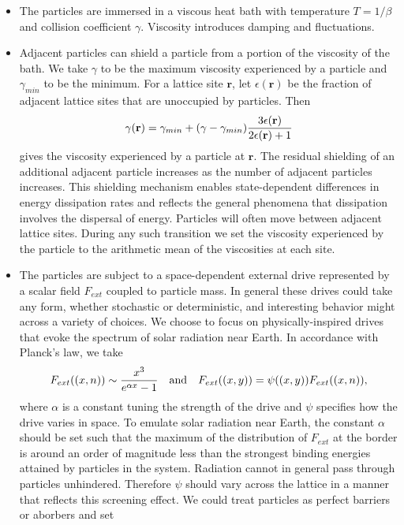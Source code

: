 \documentclass[12pt,letterpaper]{article}
\newcommand{\mb}{\mathbf}
\begin{document}
\begin{itemize}
\item The particles are immersed in a viscous heat bath with temperature $T = 1/\beta$ and collision coefficient $\gamma$. Viscosity introduces damping and fluctuations.
\item Adjacent particles can shield a particle from a portion of the viscosity of the bath. We take $\gamma$ to be the maximum viscosity experienced by a particle and $\gamma_{min}$ to be the minimum. For a lattice site $\mb{r}$, let $\epsilon(\mb{r})$ be the fraction of adjacent lattice sites that are unoccupied by particles. Then
\begin{align*}
\gamma(\mb{r}) = \gamma_{min} + (\gamma - \gamma_{min}){3\epsilon(\mb{r}) \over 2\epsilon(\mb{r}) + 1}
\end{align*}
gives the viscosity experienced by a particle at $\mb{r}$. The residual shielding of an additional adjacent particle increases as the number of adjacent particles increases. This shielding mechanism enables state-dependent differences in energy dissipation rates and reflects the general phenomena that dissipation involves the dispersal of energy. Particles will often move between adjacent lattice sites. During any such transition we set the viscosity experienced by the particle to the arithmetic mean of the viscosities at each site.
\item The particles are subject to a space-dependent external drive represented by a scalar field $F_{ext}$ coupled to particle mass. In general these drives could take any form, whether stochastic or deterministic, and interesting behavior might across a variety of choices. We choose to focus on physically-inspired drives that evoke the spectrum of solar radiation near Earth. In accordance with Planck's law, we take
\begin{align*}
F_{ext}((x, n)) \sim {x^{3} \over e^{\alpha x} - 1} \quad \textrm{and} \quad F_{ext}((x, y)) = \psi((x, y))F_{ext}((x, n)),
\end{align*}
where $\alpha$ is a constant tuning the strength of the drive and $\psi$ specifies how the drive varies in space. To emulate solar radiation near Earth, the constant $\alpha$ should be set such that the maximum of the distribution of $F_{ext}$ at the border is around an order of magnitude less than the strongest binding energies attained by particles in the system. Radiation cannot in general pass through particles unhindered. Therefore $\psi$ should vary across the lattice in a manner that reflects this screening effect. We could treat particles as perfect barriers or aborbers and set

\end{itemize}
\end{document}
